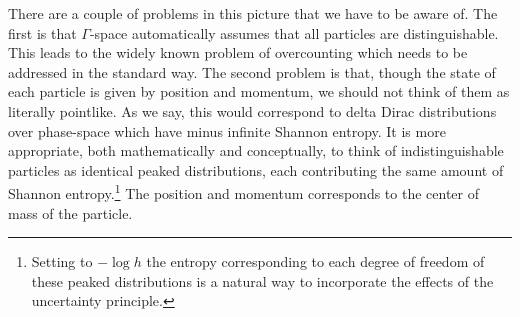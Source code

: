 \documentclass{article}
\begin{document}
There are a couple of problems in this picture that we have to be aware of. The first is that $\Gamma$-space automatically assumes that all particles are distinguishable. This leads to the widely known problem of overcounting which needs to be addressed in the standard way. The second problem is that, though the state of each particle is given by position and momentum, we should not think of them as literally pointlike. As we say, this would correspond to delta Dirac distributions over phase-space which have minus infinite Shannon entropy. It is more appropriate, both mathematically and conceptually, to think of indistinguishable particles as identical peaked distributions, each contributing the same amount of Shannon entropy.\footnote{Setting to $-\log h$ the entropy corresponding to each degree of freedom of these peaked distributions is a natural way to incorporate the effects of the uncertainty principle.} The position and momentum corresponds to the center of mass of the particle.
\end{document}
